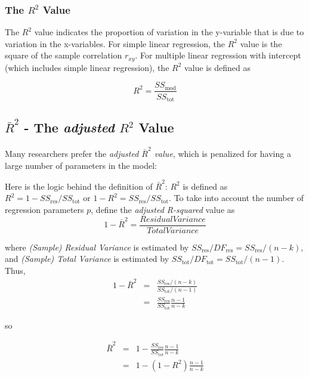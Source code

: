 \subsubsection{The $R^2$ Value}

The $R^2$ value indicates the proportion of variation in the y-variable that is due to variation in the x-variables. For simple linear regression, the $R^2$ value is the square of the sample correlation $r_{xy}$. For multiple linear regression with intercept (which includes simple linear regression), the $R^2$ value is defined as

\begin{equation}
  R^2 = \frac{SS_\text{mod}}{SS_\text{tot}}
\end{equation}

\subsection{$\bar{R}^2$ - The \emph{adjusted} $R^2$ Value}\label{sec:adjustedR2}

Many researchers prefer the \emph{adjusted $\bar{R}^2$ value}, which is penalized for having a large number of parameters in the model:

Here is the logic behind the definition of $\bar{R}^2$:
$R^2$ is defined as $R^2 = 1 - SS_\text{res}/SS_\text{tot}$ or $1 - R^2 = SS_\text{res}/SS_\text{tot}$. To take into account the number of regression parameters $p$, define the \emph{adjusted R-squared} value as
\begin{equation}
  1- \bar{R}^2 = \frac{ResidualVariance }{Total Variance}
\end{equation}

where \emph{(Sample) Residual Variance} is estimated by $SS_\text{res}/DF_\text{res} = SS_\text{res}/(n-k)$, and \emph{(Sample) Total Variance} is estimated by $SS_\text{tot}/DF_\text{tot} = SS_\text{tot}/(n-1)$. Thus,
\begin{eqnarray}
    1 - \bar{R}^2 &=& \frac{SS_\text{res}/(n - k)}{SS_\text{tot}/(n - 1)} \nonumber \\
          	&=& \frac{SS_\text{res}}{SS_\text{tot}}\frac{n - 1}{n - k}
\end{eqnarray}

so

\begin{eqnarray}
  \bar{R}^2 &=& 1 - \frac{SS_\text{res}}{SS_\text{tot}} \frac{n - 1}{n - k} \nonumber  \\
    &=& 1 - (1 - R^2)\frac{n - 1}{n - k}
\end{eqnarray}


